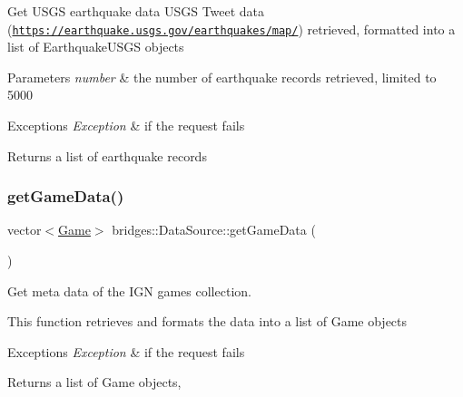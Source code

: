 Get U\+S\+GS earthquake data U\+S\+GS Tweet data (\href{https://earthquake.usgs.gov/earthquakes/map/}{\tt https\+://earthquake.\+usgs.\+gov/earthquakes/map/}) retrieved, formatted into a list of Earthquake\+U\+S\+GS objects


\begin{DoxyParams}{Parameters}
{\em number} & the number of earthquake records retrieved, limited to 5000 \\
\hline
\end{DoxyParams}

\begin{DoxyExceptions}{Exceptions}
{\em Exception} & if the request fails\\
\hline
\end{DoxyExceptions}
\begin{DoxyReturn}{Returns}
a list of earthquake records 
\end{DoxyReturn}
\mbox{\label{classbridges_1_1_data_source_aa902e1dffd4169e2f6e6820299b8cde1}} 
\subsubsection{\texorpdfstring{get\+Game\+Data()}{getGameData()}}
{\footnotesize\ttfamily vector$<$\mbox{\hyperlink{classbridges_1_1dataset_1_1_game}{Game}}$>$ bridges\+::\+Data\+Source\+::get\+Game\+Data (\begin{DoxyParamCaption}{ }\end{DoxyParamCaption})\hspace{0.3cm}{\ttfamily [inline]}}

Get meta data of the I\+GN games collection.

This function retrieves and formats the data into a list of Game objects


\begin{DoxyExceptions}{Exceptions}
{\em Exception} & if the request fails\\
\hline
\end{DoxyExceptions}
\begin{DoxyReturn}{Returns}
a list of Game objects, 
\end{DoxyReturn}
\mbox{\label{classbridges_1_1_data_source_ac4edf55c163c60f17b13f5499e5d2e65}} 
